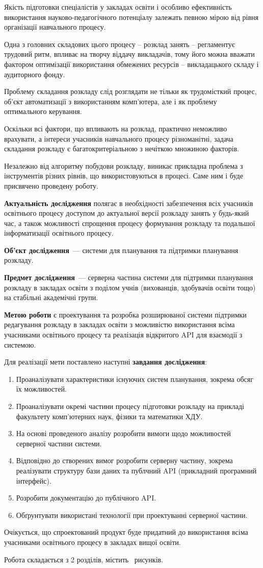 
Якість підготовки спеціалістів у закладах освіти і особливо ефективність використання науково-педагогічного потенціалу залежать певною мірою від рівня організації навчального процесу.

Одна з головних складових цього процесу -- розклад занять -- регламентує трудовий ритм, впливає на творчу віддачу викладачів, тому його можна вважати фактором оптимізації використання обмежених ресурсів -- викладацького складу і аудиторного фонду.

Проблему складання розкладу слід розглядати не тільки як трудомісткий процес, об'єкт автоматизації з використанням комп’ютера, але і як проблему оптимального керування. 

Оскільки всі фактори, що впливають на розклад, практично неможливо врахувати, а інтереси учасників навчального процесу різноманітні, задача складання розкладу є багатокритеріальною з нечіткою множиною факторів.

Незалежно від алгоритму побудови розкладу, виникає прикладна проблема з інструментів різних рівнів, що використовуються в процесі. Саме ним і буде присвячено проведену роботу.

\textbf{Актуальність дослідження} полягає в необхідності забезпечення всіх учасників освітнього процесу доступом до актуальної версії розкладу занять у будь-який час, а також можливості спрощення процесу формування розкладу та подальшої інформатизації освітнього процесу.

\textbf{Об’єкт дослідження}~--- системи для планування та підтримки планування розкладу.

\textbf{Предмет дослідження}~--- серверна частина системи для підтримки планування розкладу в закладах освіти з поділом учнів (вихованців, здобувачів освіти тощо) на стабільні академічні групи.

\textbf{Метою роботи} є проектування та розробка розширюваної системи підтримки редагування розкладу в закладах освіти з можливістю використання всіма учасниками освітнього процесу та реалізація відкритого API для взаємодії з системою.

Для реалізації мети поставлено наступні \textbf{завдання дослідження}:
\begin{enumerate}
	\item Проаналізувати характеристики існуючих систем планування, зокрема обсяг їх можливостей.
	\item Проаналізувати окремі частини процесу підготовки розкладу на прикладі факультету комп'ютерних наук, фізики та математики ХДУ.
	\item На основі проведеного аналізу розробити вимоги щодо можливостей серверної частини системи.
	\item Відповідно до створених вимог розробити серверну частину, зокрема реалізувати структуру бази даних та публчний API (прикладний програмний інтерфейс).
	\item Розробити документацію до публічного API.
	\item Обґрунтувати використані технології при проектуванні серверної частини.
\end{enumerate}

Очікується, що спроектований продукт буде придатний до використання всіма учасниками освітнього процесу в закладах вищої освіти.

Робота складається з 2 розділів, містить \totalfigures\ рисунків. 
